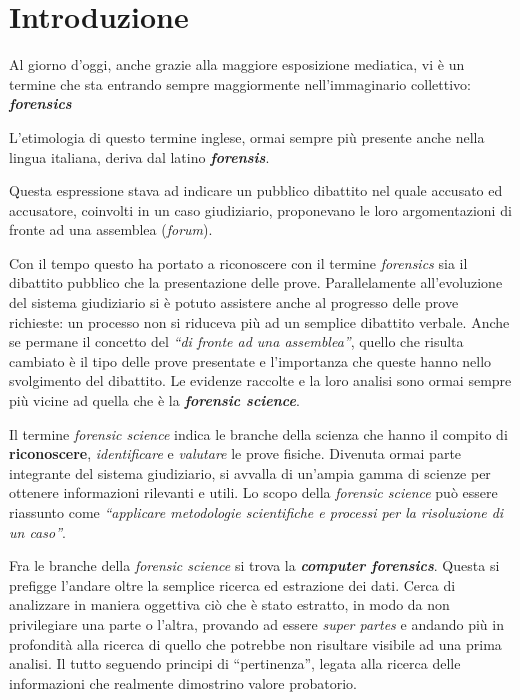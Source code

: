 
\chapter{Introduzione}

Al giorno d'oggi, anche grazie alla maggiore esposizione mediatica, vi è un termine che sta entrando sempre maggiormente nell'immaginario collettivo: \textit{\textbf{forensics}}

L'etimologia di questo termine inglese, ormai sempre più presente anche nella lingua italiana, deriva dal latino \textbf{\textit{forensis}}. 

Questa espressione stava ad indicare un pubblico dibattito nel quale accusato ed accusatore, coinvolti in un caso giudiziario, proponevano le loro argomentazioni di fronte ad una assemblea (\textit{forum}). 

Con il tempo questo ha portato a riconoscere con il termine \textit{forensics} sia il dibattito pubblico che la presentazione delle prove. Parallelamente all'evoluzione del sistema giudiziario si è potuto assistere anche al progresso delle prove richieste: un processo non si riduceva più ad un semplice dibattito verbale. Anche se permane il concetto del \textit{``di fronte ad una assemblea''}, quello che risulta cambiato è il tipo delle prove presentate e l'importanza che queste hanno nello svolgimento del dibattito.\cite{Noctis} Le evidenze raccolte e la loro analisi sono ormai sempre più vicine ad quella che è la \textbf{\textit{forensic science}}. 

Il termine \textit{forensic science} indica le branche della scienza che hanno il compito di \textbf{riconoscere}, \textit{identificare} e \textit{valutare} le prove fisiche. Divenuta ormai parte integrante del sistema giudiziario, si avvalla di un'ampia gamma di scienze per ottenere informazioni rilevanti e utili. Lo scopo della \textit{forensic science} può essere riassunto come \textit{``applicare metodologie scientifiche e processi per la risoluzione di un caso''}.\cite{Forensics}

Fra le branche della \textit{forensic science} si trova la \textbf{\textit{computer forensics}}. Questa si prefigge l'andare oltre la semplice ricerca ed estrazione dei dati. Cerca di analizzare in maniera oggettiva ciò che è stato estratto, in modo da non privilegiare una parte o l'altra, provando ad essere \textit{super partes} e andando più in profondità alla ricerca di quello che potrebbe non risultare visibile ad una prima analisi. Il tutto seguendo principi di ``pertinenza'', legata alla ricerca delle informazioni che realmente dimostrino valore probatorio.

